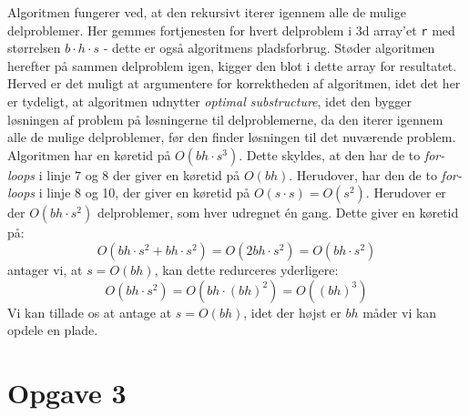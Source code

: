 \documentclass{report}
\begin{document}
Algoritmen fungerer ved, at den rekursivt iterer igennem alle de mulige delproblemer. Her gemmes fortjenesten for hvert delproblem i 3d array'et \texttt{r} med størrelsen $b \cdot h \cdot s$ - dette er også algoritmens pladsforbrug. Støder algoritmen herefter på sammen delproblem igen, kigger den blot i dette array for resultatet. Herved er det muligt at argumentere for korrektheden af algoritmen, idet det her er tydeligt, at algoritmen udnytter \textit{optimal substructure}, idet den bygger løsningen af problem på løsningerne til delproblemerne, da den iterer igennem alle de mulige delproblemer, før den finder løsningen til det nuværende problem. \\
Algoritmen har en køretid på $O(bh \cdot s^3)$. Dette skyldes, at den har de to \textit{for-loops} i linje 7 og 8 der giver en køretid på $O(bh)$. Herudover, har den de to \textit{for-loops} i linje 8 og 10, der giver en køretid på $O(s \cdot s) = O(s^2)$. Herudover er der $O(bh \cdot s^2)$ delproblemer, som hver udregnet én gang. Dette giver en køretid på:
$$O(bh \cdot s^2 + bh \cdot s^2) = O(2 bh \cdot s^2) = O(bh \cdot s^2)$$
antager vi, at $s = O(bh)$, kan dette redurceres yderligere:
$$O(bh \cdot s^2) = O(bh \cdot (bh)^2) = O((bh)^3)$$
Vi kan tillade os at antage at $s = O(bh)$, idet der højst er $bh$ måder vi kan opdele en plade. \\
\newpage


\section*{Opgave 3}
\end{document}
